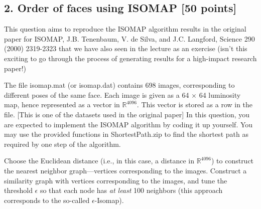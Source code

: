 \documentclass[twoside,12pt]{article}
\begin{document}

\subsection*{2. Order of faces using ISOMAP [50 points]}

This question aims to reproduce the ISOMAP algorithm results in the original paper for ISOMAP, J.B. Tenenbaum, V. de Silva, and J.C. Langford, Science 290 (2000) 2319-2323 that we have also seen in the lecture as an exercise (isn't this exciting to go through the process of generating results for a high-impact research paper!) 


The file \textsf{isomap.mat} (or \textsf{isomap.dat}) contains 698 images, corresponding to different poses of the same face. Each image is given as a 64 $\times$ 64 luminosity map, hence represented as a vector in $\mathbb R^{4096}$. This vector is stored as a row in the file. [This is one of the datasets used in the original paper] In this question, you are expected to implement the ISOMAP algorithm by coding it up yourself. You may use the provided functions in \textsf{ShortestPath.zip} to find the shortest path as required by one step of the algorithm. 

Choose the Euclidean distance (i.e., in this case, a distance in $\mathbb R^{4096}$) to construct the nearest neighbor graph—vertices corresponding to the images. Construct a similarity graph with vertices corresponding to the images, and tune the threshold $\epsilon$ so that each node has {\it at least} 100 neighbors (this approach corresponds to the so-called $\epsilon$-Isomap).
\end{document}
